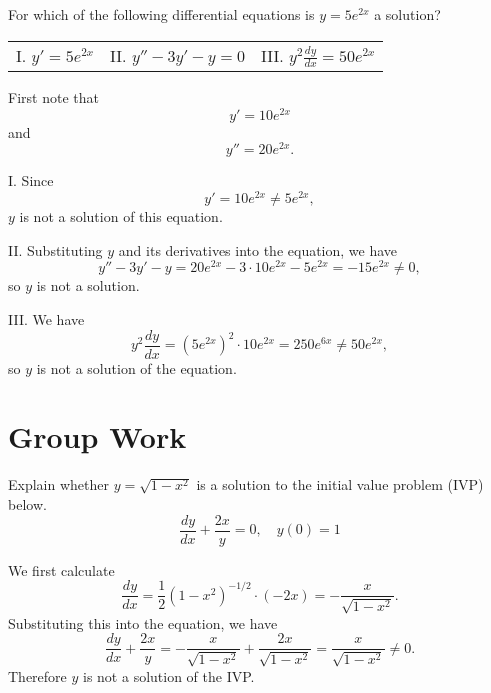 \documentclass[noauthor, handout]{ximera}
\begin{document}
\begin{problem} 
For which of the following differential equations is $y=5e^{2x}$ a solution?

\begin{tabular}{lll}
I. $y'=5e^{2x}$ \qquad \qquad \qquad & II. $y''-3y'-y =0$ \qquad \qquad \qquad & III. $y^2\frac{dy}{dx}=50e^{2x}$
\end{tabular}

\begin{freeResponse}
First note that 
$$
y' = 10 e^{2x}
$$
and
$$
y'' = 20 e^{2x}.
$$

I. Since 
$$
y' = 10 e^{2x} \neq 5 e^{2x},
$$
$y$ is not a solution of this equation.

II. Substituting $y$ and its derivatives into the equation, we have
$$
y''-3y'-y = 20e^{2x}-3 \cdot 10e^{2x} - 5e^{2x} = -15 e^{2x} \neq 0,
$$
so $y$ is not a solution.

III. We have 
$$
y^2 \frac{dy}{dx} = \left(5e^{2x}\right)^2 \cdot 10e^{2x} = 250 e^{6x} \neq 50 e^{2x},
$$
so $y$ is not a solution of the equation.
\end{freeResponse}
\end{problem}

\section{Group Work}
\begin{problem}
Explain whether $y= \sqrt{1-x^2}$ is a solution to the initial value problem (IVP)  below. $$\frac{dy}{dx} +\frac{2x}{y} =0, \quad y(0)=1$$

\begin{freeResponse}
We first calculate
$$
\frac{dy}{dx} = \frac{1}{2} (1-x^2)^{-1/2} \cdot (-2x) = -\frac{x}{\sqrt{1-x^2}}.
$$
Substituting this into the equation, we have
$$
\frac{dy}{dx} +\frac{2x}{y} = -\frac{x}{\sqrt{1-x^2}} + \frac{2x}{\sqrt{1-x^2}} = \frac{x}{\sqrt{1-x^2}} \neq 0.
$$
Therefore $y$ is not a solution of the IVP.
\end{freeResponse}
\end{problem}
\end{document}
